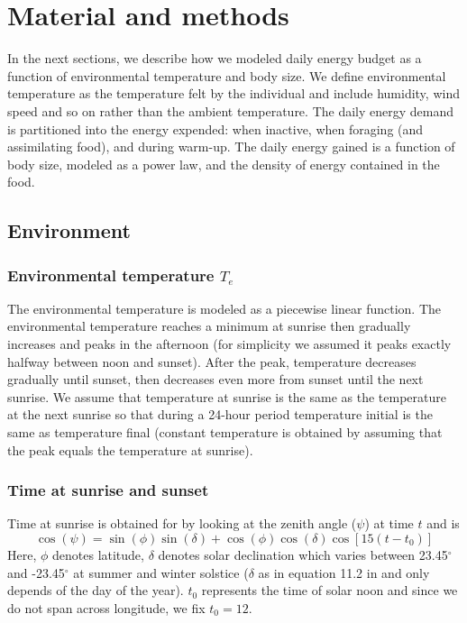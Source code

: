 \section*{Material and methods}
In the next sections, we describe how we modeled daily energy budget as a function of environmental temperature and body size.
We define environmental temperature as the temperature felt by the individual and include humidity, wind speed  and so on rather than the ambient temperature.
The daily energy demand is partitioned into the energy expended: when inactive, when foraging (and assimilating food), and during warm-up.
The daily energy gained is a function of body size, modeled as a power law, and the density of energy contained in the food. 

\subsection*{Environment}

\subsubsection*{Environmental temperature $T_e$}
The environmental temperature is modeled as a piecewise linear function.
The environmental temperature reaches a minimum at sunrise then gradually increases and peaks in the afternoon (for simplicity we assumed it peaks exactly halfway between noon and sunset).
After the peak, temperature decreases gradually until sunset, then decreases even more from sunset until the next sunrise.
We assume that temperature at sunrise is the same as the temperature at the next sunrise so that during a 24-hour period  temperature initial is the same as temperature final (constant temperature is obtained  by assuming that the peak equals the temperature at sunrise). 

\subsubsection*{Time at sunrise and sunset}
Time at sunrise is obtained for \citet{Campbell2012} by looking at the zenith angle ($\psi$) at time $t$ and is
\begin{equation}  \label{eq:psi}
\cos(\psi) = \sin(\phi) \sin(\delta) + \cos(\phi) \cos(\delta) \cos[15 (t- t_0)] 
\end{equation}
Here, $\phi$ denotes latitude, $\delta$ denotes solar declination which varies between 23.45$^\circ$ and  -23.45$^\circ$ at summer and winter solstice 
($\delta$ as in equation 11.2 in \citet{Campbell2012} and only depends of the day of the year). 
$t_0$ represents the time of solar noon and since we do not span across longitude, we fix $t_0 = 12$.

